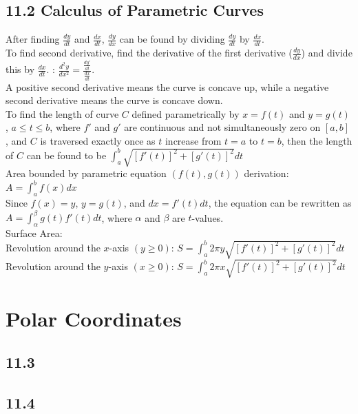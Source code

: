 \documentclass{article}
\begin{document}
        \subsection*{11.2 Calculus of Parametric Curves}
            After finding $\frac{dy}{dt}$ and $\frac{dx}{dt}$, $\frac{dy}{dx}$ can be found by dividing $\frac{dy}{dt}$ by $\frac{dx}{dt}$. \\
            To find second derivative, find the derivative of the first derivative ($\frac{dy}{dx}$) and divide this by $\frac{dx}{dt}$. : $\frac{d^2y}{dx^2} = \frac{\frac{dy'}{dt}}{\frac{dx}{dt}}$. \\
            A positive second derivative means the curve is concave up, while a negative second derivative means the curve is concave down. \\
            To find the length of curve $C$ defined parametrically by $x=f(t)$ and $y=g(t)$, $a \leq t \leq b$, where $f'$ and $g'$ are continuous and not simultaneously zero on $[a, b]$, and $C$ is traversed exactly once as $t$ increase from $t=a$ to $t=b$, then the length of $C$ can be found to be $\int_{a}^{b} \sqrt{[f'(t)]^2 + [g'(t)]^2} dt$ \\
            Area bounded by parametric equation $(f(t), g(t))$ derivation: \\
            $A = \int_{a}^{b} f(x) dx$ \\
            Since $f(x) = y$, $y = g(t)$, and $dx = f'(t)dt$, the equation can be rewritten as $A = \int_{\alpha}^{\beta} g(t) f'(t) dt$, where $\alpha$ and $\beta$ are $t$-values. \\
            Surface Area: \\
            Revolution around the $x$-axis $(y \geq 0)$: $S = \int_{a}^{b} 2 \pi y \sqrt{[f'(t)]^2 + [g'(t)]^2} dt$ \\
            Revolution around the $y$-axis $(x \geq 0)$: $S = \int_{a}^{b} 2 \pi x \sqrt{[f'(t)]^2 + [g'(t)]^2} dt$ \\

        \color{Black}
    \section{Polar Coordinates}
        \subsection*{11.3}
        \subsection*{11.4}
\end{document}
